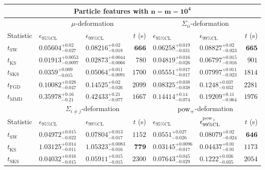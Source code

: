 \begin{tabular}{l|llr|llr}
	\toprule
	\multicolumn{7}{c}{{\bf Particle features with $\mathbf{n=m=10^{4}}$}} \\
	\toprule
	\multicolumn{1}{c}{} & \multicolumn{3}{c}{$\mu$-deformation} & \multicolumn{3}{c}{$\Sigma_{ii}$-deformation} \\
	Statistic & $\epsilon_{95\%\mathrm{CL}}$ & $\epsilon_{99\%\mathrm    {CL}}$ & $t$ (s) & $\epsilon_{95\%\mathrm{CL}}$ & $\epsilon_{99\%\mathrm{CL}}$ & $t$ (s) \\
	\midrule
	$t_{\mathrm{SW}}$ & $0.05604_{-0.027}^{+0.02}$ & $0.08216_{-0.018}^{+0.02}$ & ${\mathbf{666}}$ & $0.06258_{-0.031}^{+0.019}$ & $0.08827_{-0.023}^{+0.02}$ & ${\mathbf{665}}$ \\
	$t_{\overline{\mathrm{KS}}}$ & ${\mathbf{0.01913_{-0.0097}^{+0.0053}}}$ & ${\mathbf{0.02873_{-0.0066}^{+0.0044}}}$ & $780$ & ${\mathbf{0.04819_{-0.026}^{+0.016}}}$ & ${\mathbf{0.06797_{-0.016}^{+0.015}}}$ & $901$ \\
	$t_{\mathrm{SKS}}$ & $0.0359_{-0.015}^{+0.009}$ & $0.05064_{-0.0091}^{+0.011}$ & $1700$ & $0.05551_{-0.017}^{+0.017}$ & $0.07997_{-0.023}^{+0.011}$ & $1814$ \\
	$t_{\mathrm{FGD}}$ & $0.10082_{-0.047}^{+0.028}$ & $0.14525_{-0.026}^{+0.02}$ & $2099$ & $0.08325_{-0.038}^{+0.038}$ & $0.1248_{-0.032}^{+0.037}$ & $2281$ \\
	$t_{\mathrm{MMD}}$ & $0.35978_{-0.21}^{+0.16}$ & $0.42433_{-0.077}^{+0.21}$ & $1667$ & $0.14414_{-0.074}^{+0.14}$ & $0.19209_{-0.064}^{+0.11}$ & $1976$ \\
	\toprule
	\multicolumn{1}{c}{} & \multicolumn{3}{c}{$\Sigma_{i\neq j}$-deformation} & \multicolumn{3}{c}{$\rm{pow}_{+}$-deformation} \\
	Statistic & $\epsilon_{95\%\mathrm{CL}}$ & $\epsilon_{99\%\mathrm{CL}}$ & $t$ (s) & $\epsilon_{95\%\mathrm{CL}}$ & $\epsilon^{\rm   {pow}_{+}}_{99\%\mathrm{CL}}$ & $t$ (s) \\
	\midrule
	$t_{\mathrm{SW}}$ & $0.04972_{-0.022}^{+0.015}$ & $0.07804_{-0.017}^{+0.013}$ & $1152$ & $0.0551_{-0.026}^{+0.027}$ & $0.08079_{-0.024}^{+0.02}$ & ${\mathbf{646}}$ \\
	$t_{\overline{\mathrm{KS}}}$ & $1.03125_{-0.011}^{+0.014}$ & $1.05323_{-0.016}^{+0.0083}$ & ${\mathbf{779}}$ & ${\mathbf{0.03145_{-0.017}^{+0.0096}}}$ & ${\mathbf{0.04437_{-0.01}^{+0.01}}}$ & $1173$ \\
	$t_{\mathrm{SKS}}$ & $0.04032_{-0.015}^{+0.016}$ & $0.05911_{-0.015}^{+0.015}$ & $2300$ & $0.07643_{-0.029}^{+0.045}$ & $0.1222_{-0.035}^{+0.036}$ & $2054$ \\

\end{tabular}
